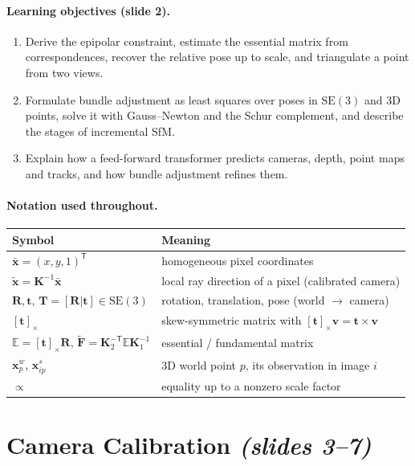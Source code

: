 \documentclass[11pt,a4paper]{article}
\newcommand{\slr}[1]{\texorpdfstring{\emph{(slides #1)}}{(slides #1)}}
\newcommand{\E}{\mathbb{E}}
\newcommand{\xt}{\tilde{\mathbf{x}}}
\newcommand{\xb}{\bar{\bm{x}}}
\newcommand{\SE}{\mathrm{SE}(3)}
\newcommand{\Fm}{\tilde{\bm F}}
\newcommand{\sk}[1]{[#1]_{\times}}
\newcommand{\tr}{^{\mathsf T}}
\theoremstyle{definition}
\theoremstyle{plain}
\theoremstyle{remark}
\begin{document}
\paragraph{Learning objectives (slide 2).}
\begin{enumerate}
\item Derive the epipolar constraint, estimate the essential matrix from correspondences, recover the
 relative pose up to scale, and triangulate a point from two views.
\item Formulate bundle adjustment as least squares over poses in $\SE$ and 3D points, solve it with
 Gauss--Newton and the Schur complement, and describe the stages of incremental SfM.
\item Explain how a feed-forward transformer predicts cameras, depth, point maps and tracks, and how
 bundle adjustment refines them.
\end{enumerate}

\paragraph{Notation used throughout.}
\begin{center}
\begin{tabular}{@{}ll@{}}
\toprule
Symbol & Meaning\\
\midrule
$\xb=(x,y,1)\tr$ & homogeneous pixel coordinates\\
$\xt=\bm K^{-1}\xb$ & local ray direction of a pixel (calibrated camera)\\
$\bm R,\bm t$, $\bm T=[\bm R|\bm t]\in\SE$ & rotation, translation, pose (world $\to$ camera)\\
$\sk{\bm t}$ & skew-symmetric matrix with $\sk{\bm t}\bm v=\bm t\times\bm v$\\
$\E=\sk{\bm t}\bm R$, $\Fm=\bm K_2^{-\mathsf T}\E\bm K_1^{-1}$ & essential / fundamental matrix\\
$\bm x^w_p$, $\bm x^s_{ip}$ & 3D world point $p$, its observation in image $i$\\
$\propto$ & equality up to a nonzero scale factor\\
\bottomrule
\end{tabular}
\end{center}

\section{Camera Calibration \slr{3--7}}
\end{document}
